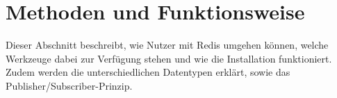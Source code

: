 
\section{Methoden und Funktionsweise}

Dieser Abschnitt beschreibt, wie Nutzer mit \ac{Redis} umgehen können, welche Werkzeuge dabei zur Verfügung stehen und wie die Installation funktioniert. Zudem werden die unterschiedlichen Datentypen erklärt, sowie das Publisher/Subscriber-Prinzip.